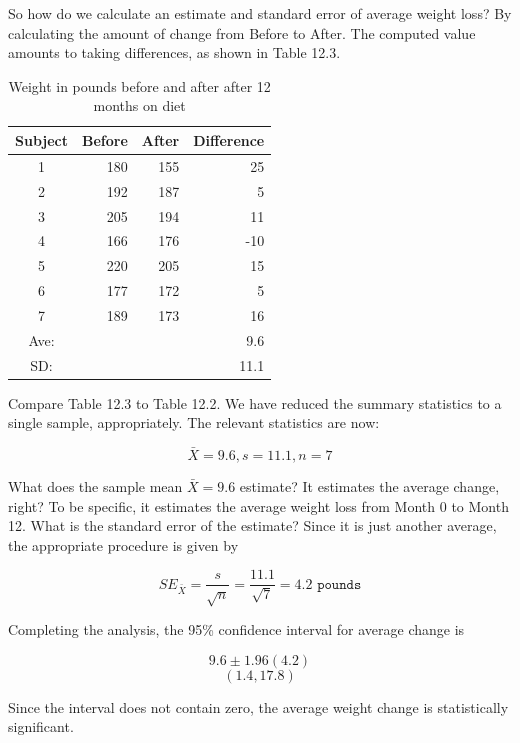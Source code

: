 \documentclass[11pt, chapterprefix=true]{scrbook}\usepackage[]{graphicx}\usepackage[]{color}
\begin{document}
So how do we calculate an estimate and standard error of average weight loss?  
By calculating the amount of change from Before to After.  The computed value amounts to taking differences, as shown in Table 12.3.

\begin{table}[ht]
\centering
\caption{Weight in pounds before and after after 12 months on diet}
\begin{tabular}{@{} crrr @{}} \hline
Subject & Before & After & Difference \\ \hline
1 & 180 & 155 & 25 \\
2 & 192 & 187 & 5 \\
3 & 205 & 194 & 11 \\
4 & 166 & 176 & -10 \\
5 & 220 & 205 & 15 \\
6 & 177 & 172 & 5 \\
7 & 189 & 173 & 16 \\ \hline
Ave: &  &  & 9.6 \\
SD:  &  & & 11.1 \\ \hline
\end{tabular}
\end{table}

Compare Table 12.3 to Table 12.2.  We have reduced the summary statistics to a single sample, appropriately.  The relevant statistics are now:

$$ \bar{X} = 9.6,  s = 11.1,  n= 7 $$

What does the sample mean $\bar{X} = 9.6$ estimate?  It estimates the average change, right?  To be specific, it estimates the average weight loss from Month 0 to Month 12.  What is the standard error of the estimate?  Since it is just another average, the appropriate procedure is given by 

\begin{equation*}
SE_{\bar{X}} = \frac{s}{\sqrt{n}} = \frac{11.1}{\sqrt{7}} = 4.2 \texttt{ pounds}
\end{equation*}

Completing the analysis, the 95\% confidence interval for average change is

\begin{equation*}
9.6 \pm 1.96 (4.2)
\end{equation*}
\begin{equation*}
(1.4, 17.8)
\end{equation*}

Since the interval does not contain zero, the average weight change is statistically significant.
\end{document}
